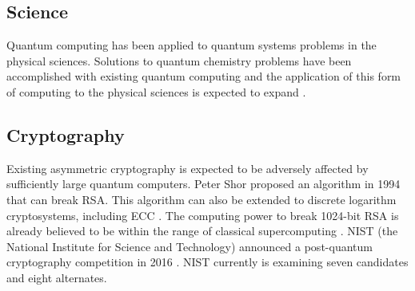 \documentclass[12pt]{article}
\begin{document}
\begin{flushleft}
\subsection{Science}
Quantum computing has been applied to quantum systems problems in the physical sciences. Solutions to quantum chemistry problems have been accomplished with existing quantum computing and the application of this form of computing to the physical sciences is expected to expand \cite{cao_quantum_2019}.

\subsection{Cryptography}
Existing asymmetric cryptography is expected to be adversely affected by sufficiently large quantum computers. Peter Shor proposed an algorithm in 1994 that can break RSA. This algorithm can also be extended to discrete logarithm cryptosystems, including ECC \cite{grumbling_quantum_2019}. The computing power to break 1024-bit RSA is already believed to be within the range of classical supercomputing \cite{bos_security_2009}.
NIST (the National Institute for Science and Technology) announced a post-quantum cryptography competition in 2016 \cite{chen_post-quantum_nodate}. %
NIST currently is examining seven candidates and eight alternates.

\newpage


\end{flushleft}
\end{document}
